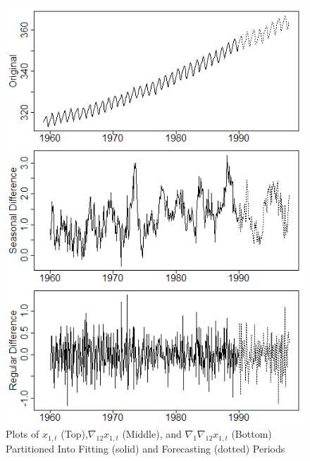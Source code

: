 \begin{figure}[htbp!]
	\centering
	\caption{Plots of $x_{1,t}$ (Top),$\nabla_{12}x_{1,t}$ (Middle), and $\nabla_1\nabla_{12}x_{1,t}$ (Bottom) Partitioned Into Fitting (solid) and Forecasting (dotted) Periods}
	\label{fig:co2plots}
	\includegraphics[scale=0.8]{co2plots}
\end{figure}

